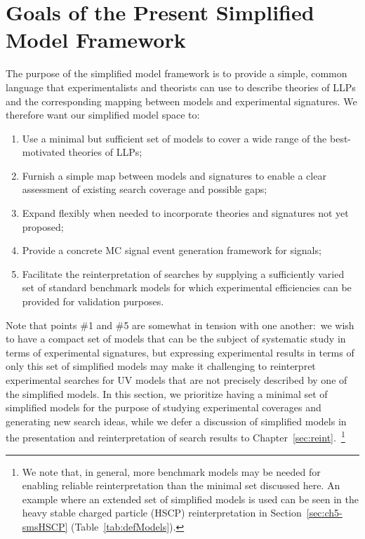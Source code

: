 \section{Goals of the Present Simplified Model Framework}\label{sec:goals}

The purpose of the simplified model framework is to provide a simple, common language that experimentalists and theorists can use to describe theories of LLPs and the corresponding mapping between models and experimental signatures.
We therefore want our simplified model space to:
%
\begin{enumerate}
%
\item Use a minimal but sufficient set of models to cover a wide range of the best-motivated theories of LLPs;
\item Furnish a simple map between models and signatures to enable a clear assessment of existing search coverage and possible gaps; 
\item Expand flexibly when needed to incorporate theories and signatures not yet proposed;
\item Provide a concrete MC signal event generation framework for signals;
\item Facilitate the reinterpretation of searches by supplying a sufficiently varied set of standard benchmark models for which experimental efficiencies can be provided for validation purposes.
\end{enumerate}
%
Note that points \#1 and \#5 are somewhat in tension with one another:~we wish to have a compact set of models that can be the subject of systematic study in terms of experimental signatures, but expressing experimental results in terms of only this set of simplified models may make it challenging to reinterpret experimental searches for UV models that are not precisely described by one of the simplified models.
In this section, we prioritize having a minimal set of simplified models for the purpose of studying experimental coverages and generating new search ideas, while we defer a discussion of simplified models in the presentation and
reinterpretation of search results to Chapter~\ref{sec:reint}.~\footnote{We note that, in general, more benchmark models may be needed for enabling reliable reinterpretation than the minimal set discussed here. An example where an extended set of simplified models is used can be seen in the heavy stable charged particle (HSCP) reinterpretation in Section~\ref{sec:ch5-smsHSCP} (Table~\ref{tab:defModels}).}

